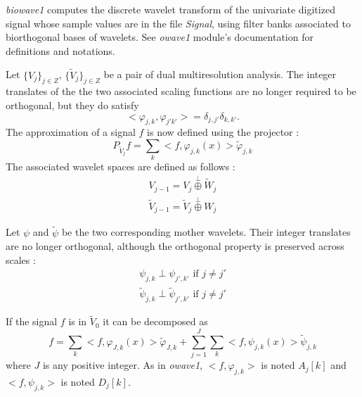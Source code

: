 \parindent 0.6cm 
\parskip 0.4cm

{\em biowave1} computes the discrete wavelet transform of the univariate digitized signal whose sample values are in the file {\em Signal}, using filter banks associated to biorthogonal bases of wavelets. See {\em owave1} module's documentation for definitions and notations.

Let \( \{V_{j}\}_{j \in Z} \), \( \{\tilde{V}_{j}\}_{j \in Z} \) be a pair of dual multiresolution analysis. The integer translates of the the two associated scaling functions are no longer required to be orthogonal, but they do satisfy
\[
<\varphi_{j,k},\varphi_{j'k'}> = \delta_{j,j'} \delta_{k,k'}.
\]
The approximation of a signal $f$ is now defined using the projector :
\[
P_{\tilde{V}_{j}} f = \sum_{k} < f, \varphi_{j,k} (x)> \tilde{\varphi}_{j,k}
\]
The associated wavelet spaces are defined as follows :
\begin{eqnarray*}
V_{j-1} = V_{j} \stackrel{\perp}{\oplus} \tilde{W}_{j} \\
\tilde{V}_{j-1} = \tilde{V}_{j} \stackrel{\perp}{\oplus} W_{j}
\end{eqnarray*}

Let $\psi$ and $\tilde{\psi}$ be the two corresponding mother wavelets. Their integer translates are no longer orthogonal, although the orthogonal property is preserved across scales :
\begin{eqnarray*}
\psi_{j,k} \perp \psi_{j',k'}  \mbox{ if } j \neq j' \\
\tilde{\psi}_{j,k} \perp \tilde{\psi}_{j',k'}  \mbox{ if } j \neq j'
\end{eqnarray*}

If the signal $f$ is in $\tilde{V}_{0}$ it can be decomposed as 
\[
f = \sum_{k} < f, \varphi_{J,k} (x)> \tilde{\varphi}_{J,k} + \sum_{j=1}^{J} \sum_{k} < f, \psi_{j,k} (x)> \tilde{\psi}_{j,k}
\]
where $J$ is any positive integer.
As in {\em owave1}, $<f,\varphi_{j,k}>$ is noted $A_{j}[k]$ and $<f,\psi_{j,k}>$ is noted $D_{j}[k]$. 

